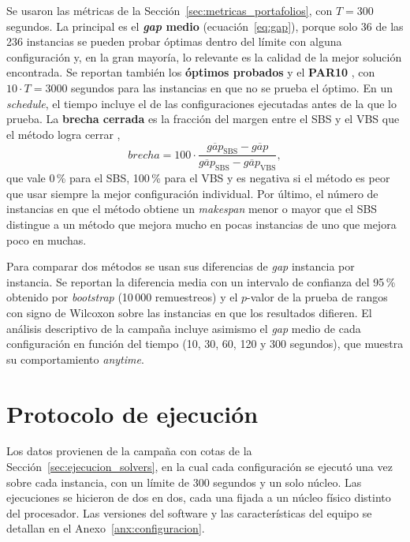 Se usaron las métricas de la Sección~\ref{sec:metricas_portafolios}, con
$T = 300$ segundos. La principal es el \textbf{\textit{gap} medio}
(ecuación~\eqref{eq:gap}), porque solo 36 de las 236 instancias se pueden
probar óptimas dentro del límite con alguna configuración y, en la gran
mayoría, lo relevante es la calidad de la mejor solución encontrada. Se
reportan también los \textbf{óptimos probados} y el \textbf{PAR10}
\citep{lindauer2019}, con
$10 \cdot T = 3000$ segundos para las instancias en que no se prueba el óptimo.
En un \textit{schedule}, el tiempo incluye el de las configuraciones
ejecutadas antes de la que lo prueba. La \textbf{brecha cerrada} es la
fracción del margen entre el SBS y el VBS que el método logra cerrar
\citep{kerschke2019, lindauer2019},
\begin{equation}
  \mathit{brecha} = 100 \cdot
  \frac{\overline{\mathit{gap}}_{\mathrm{SBS}} - \overline{\mathit{gap}}}
       {\overline{\mathit{gap}}_{\mathrm{SBS}} - \overline{\mathit{gap}}_{\mathrm{VBS}}},
  \label{eq:brecha}
\end{equation}
que vale 0\,\% para el SBS, 100\,\% para el VBS y es negativa si el método es
peor que usar siempre la mejor configuración individual. Por último, el número
de instancias en que el método obtiene un \textit{makespan} menor o mayor que
el SBS distingue a un método que mejora mucho en pocas instancias de uno que
mejora poco en muchas.

Para comparar dos métodos se usan sus diferencias de \textit{gap} instancia
por instancia. Se reportan la diferencia media con un intervalo de confianza
del 95\,\% obtenido por \textit{bootstrap} (10\,000 remuestreos) y el
$p$-valor de la prueba de rangos con signo de Wilcoxon sobre las instancias
en que los resultados difieren. El análisis descriptivo de la campaña incluye
asimismo el \textit{gap} medio de cada configuración en función del tiempo (10,
30, 60, 120 y 300 segundos), que muestra su comportamiento \textit{anytime}.

\section{Protocolo de ejecución}
\label{sec:protocolo}

Los datos provienen de la campaña con cotas de la
Sección~\ref{sec:ejecucion_solvers}, en la cual cada configuración se ejecutó
una vez sobre cada instancia, con un límite de 300 segundos y un solo núcleo.
Las ejecuciones se hicieron de dos en dos, cada una fijada a un núcleo físico
distinto del procesador. Las versiones del software y las características del
equipo se detallan en el Anexo~\ref{anx:configuracion}.

